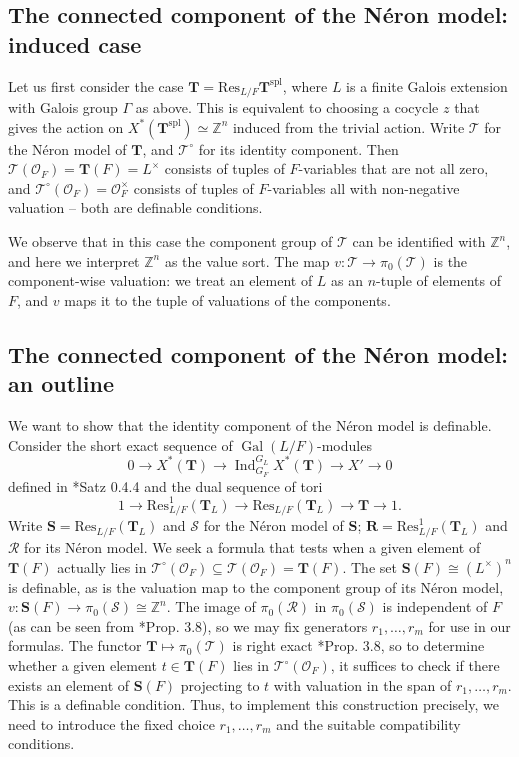 \documentclass{amsart}
\newcommand{\Z}{{\mathbb Z}}
\newcommand{\ri}{\mathcal{O}}
\newcommand{\bT}{\mathbf {T}}
\newcommand{\bS}{\mathbf{S}}
\newcommand{\bR}{\mathbf{R}}
\newcommand\spl{\mathrm{spl}}
\newcommand{\Res}{\mathrm{Res}}
\newcommand{\Ner}[1]{\mathcal{#1}}
\newcommand{\NerC}[1]{\mathcal{#1}^\circ}
\DeclareMathOperator{\Gal}{Gal}
\DeclareMathOperator{\Ind}{Ind}
\theoremstyle{plain}
\theoremstyle{definition}
\begin{document}
\subsection{The connected component of the N\'eron model: induced case}
Let us first consider the case $\bT=\Res_{L/F} \bT^\spl$, where $L$ is a finite Galois extension with Galois group $\Gamma$ as above. This is equivalent to choosing a cocycle $z$ that gives the action on $X^\ast(\bT^\spl)\simeq \Z^n$ induced from the trivial action. 
Write $\Ner{T}$ for the N\'eron model of $\bT$, and $\NerC{T}$ for its identity component.  Then $\Ner{T}(\ri_F) = \bT(F) = L^\times$ consists of tuples of $F$-variables that are not all zero, and $\NerC{T}(\ri_F) = \ri_F^\times$ consists of tuples of $F$-variables all with non-negative valuation -- both are definable conditions.

We observe that in this case the component group of $\Ner{T}$ can be identified with $\Z^n$, and here we interpret $\Z^n$ as the value sort. The map $v:\Ner{T} \to \pi_0(\Ner{T})$ is the component-wise valuation: we treat an element of $L$ as an $n$-tuple of elements of $F$, and $v$ maps it to the  tuple of valuations of the components. 

\subsection{The connected component of the N\'eron model: an outline}

We want to show that the identity component of the N\'eron model is definable.  Consider the short exact sequence of $\Gal(L/F)$-modules
\[
0 \to X^*(\bT) \to \Ind_{G_F}^{G_L} X^*(\bT) \to X' \to 0
\]
defined in \cite{brahm}*{Satz 0.4.4} and the dual sequence of tori
\[
1 \to \Res_{L/F}^1(\bT_L) \to \Res_{L/F} (\bT_L) \to \bT \to 1.
\]
Write $\bS = \Res_{L/F} (\bT_L)$ and $\Ner{S}$ for the N\'eron model of $\bS$; $\bR = \Res_{L/F}^1 (\bT_L)$ and $\Ner{R}$ for its N\'eron model. 
We seek a formula that tests when a given element of $\bT(F)$ actually lies in $\NerC{T}(\ri_F) \subseteq \Ner{T}(\ri_F) = \bT(F)$. The set $\bS(F) \cong (L^\times)^n$ is definable, as is the valuation map to the component group of its N\'eron model, $v : \bS(F) \to \pi_0(\Ner{S}) \cong \Z^n$.  The image of $\pi_0(\Ner{R})$ in $\pi_0(\Ner{S})$ is independent of $F$ (as can be seen from \cite{bertrapelle-gonzales:13b}*{Prop. 3.8}), so we may fix generators $r_1, \ldots, r_m$ for use in our formulas.  The functor $\bT \mapsto \pi_0(\Ner{T})$ is right exact \cite{bertrapelle-gonzales:13b}*{Prop. 3.8}, so to determine whether a given element $t \in \bT(F)$ lies in $\NerC{T}(\ri_F)$, it suffices to check if there exists an element of $\bS(F)$ projecting to $t$ with valuation in the span of $r_1, \ldots, r_m$.  This is a definable condition.
Thus, to implement this construction precisely, we need to introduce the fixed choice 
$r_1, \dots, r_m$ and the suitable compatibility conditions. 
\end{document}
